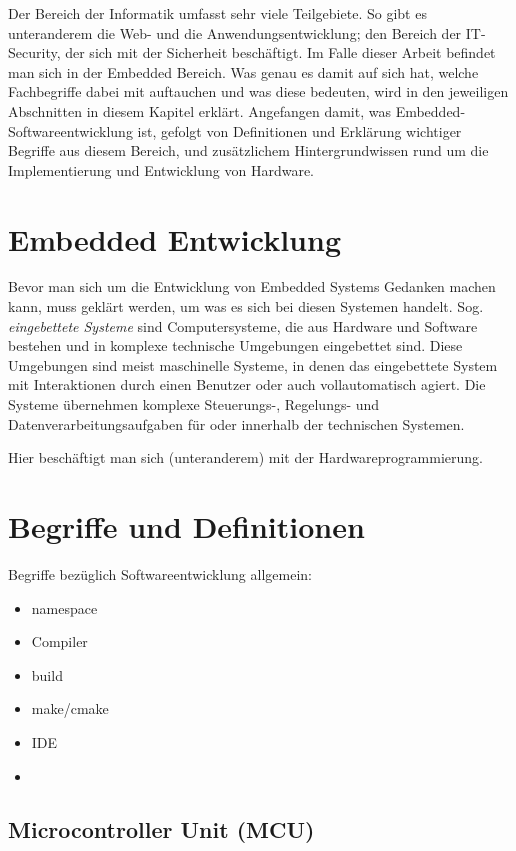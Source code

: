 
Der Bereich der Informatik umfasst  sehr viele Teilgebiete.
So gibt es unteranderem die Web- und die Anwendungsentwicklung; den Bereich der IT-Security, der sich mit der Sicherheit beschäftigt.
Im Falle dieser Arbeit befindet man sich in der Embedded Bereich.
Was genau es damit auf sich hat, welche Fachbegriffe dabei mit auftauchen und was diese bedeuten, wird in den jeweiligen Abschnitten in diesem Kapitel erklärt.
Angefangen damit, was Embedded-Softwareentwicklung ist,
gefolgt von Definitionen und Erklärung wichtiger Begriffe aus diesem Bereich,
und zusätzlichem Hintergrundwissen rund um die Implementierung und Entwicklung von Hardware.

\section{Embedded Entwicklung}
Bevor man sich um die Entwicklung von Embedded Systems Gedanken machen kann, muss geklärt werden, um was es sich bei diesen Systemen handelt.
Sog. \emph{eingebettete Systeme} sind Computersysteme, die aus Hardware und Software bestehen und in komplexe technische Umgebungen eingebettet sind.
Diese Umgebungen sind meist maschinelle Systeme, in denen das eingebettete System mit Interaktionen durch einen Benutzer oder auch vollautomatisch agiert.
Die Systeme übernehmen komplexe Steuerungs-, Regelungs- und Datenverarbeitungsaufgaben für oder innerhalb der technischen Systemen.

Hier beschäftigt man sich (unteranderem) mit der Hardwareprogrammierung.


\section{Begriffe und Definitionen}
Begriffe bezüglich Softwareentwicklung allgemein:
\begin{itemize}
	\item namespace
	\item Compiler
	\item build
	\item make/cmake
	\item IDE
	\item 
\end{itemize}


\subsection*{Microcontroller Unit (MCU)}


